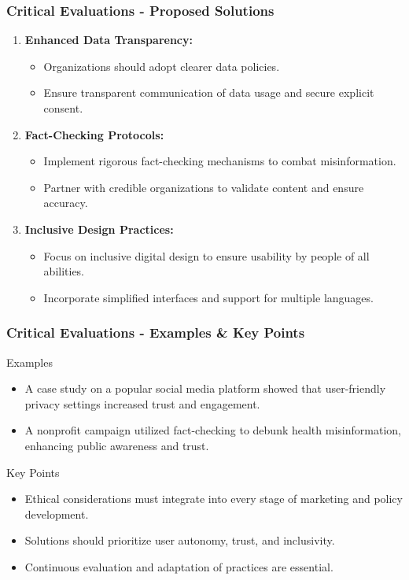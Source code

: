 \documentclass{beamer}
\begin{document}
\begin{frame}[fragile]
    \frametitle{Critical Evaluations - Proposed Solutions}
    \begin{enumerate}
        \item \textbf{Enhanced Data Transparency:}
        \begin{itemize}
            \item Organizations should adopt clearer data policies.
            \item Ensure transparent communication of data usage and secure explicit consent.
        \end{itemize}
        
        \item \textbf{Fact-Checking Protocols:}
        \begin{itemize}
            \item Implement rigorous fact-checking mechanisms to combat misinformation.
            \item Partner with credible organizations to validate content and ensure accuracy.
        \end{itemize}
        
        \item \textbf{Inclusive Design Practices:}
        \begin{itemize}
            \item Focus on inclusive digital design to ensure usability by people of all abilities.
            \item Incorporate simplified interfaces and support for multiple languages.
        \end{itemize}
    \end{enumerate}
\end{frame}

\begin{frame}[fragile]
    \frametitle{Critical Evaluations - Examples & Key Points}
    \begin{block}{Examples}
        \begin{itemize}
            \item A case study on a popular social media platform showed that user-friendly privacy settings increased trust and engagement.
            \item A nonprofit campaign utilized fact-checking to debunk health misinformation, enhancing public awareness and trust.
        \end{itemize}
    \end{block}
    
    \begin{block}{Key Points}
        \begin{itemize}
            \item Ethical considerations must integrate into every stage of marketing and policy development.
            \item Solutions should prioritize user autonomy, trust, and inclusivity.
            \item Continuous evaluation and adaptation of practices are essential.
        \end{itemize}
    \end{block}
\end{frame}
\end{document}
